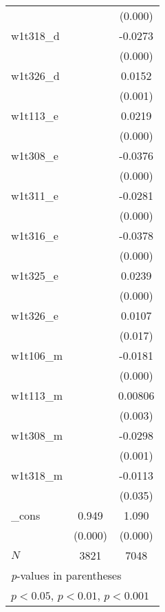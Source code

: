 {\begin{tabular}{l*{2}{c}}
            &                     &     (0.000)         \\
[1em]
w1t318\_d    &                     &     -0.0273\sym{***}\\
            &                     &     (0.000)         \\
[1em]
w1t326\_d    &                     &      0.0152\sym{***}\\
            &                     &     (0.001)         \\
[1em]
w1t113\_e    &                     &      0.0219\sym{***}\\
            &                     &     (0.000)         \\
[1em]
w1t308\_e    &                     &     -0.0376\sym{***}\\
            &                     &     (0.000)         \\
[1em]
w1t311\_e    &                     &     -0.0281\sym{***}\\
            &                     &     (0.000)         \\
[1em]
w1t316\_e    &                     &     -0.0378\sym{***}\\
            &                     &     (0.000)         \\
[1em]
w1t325\_e    &                     &      0.0239\sym{***}\\
            &                     &     (0.000)         \\
[1em]
w1t326\_e    &                     &      0.0107\sym{*}  \\
            &                     &     (0.017)         \\
[1em]
w1t106\_m    &                     &     -0.0181\sym{***}\\
            &                     &     (0.000)         \\
[1em]
w1t113\_m    &                     &     0.00806\sym{**} \\
            &                     &     (0.003)         \\
[1em]
w1t308\_m    &                     &     -0.0298\sym{**} \\
            &                     &     (0.001)         \\
[1em]
w1t318\_m    &                     &     -0.0113\sym{*}  \\
            &                     &     (0.035)         \\
[1em]
\_cons      &       0.949\sym{***}&       1.090\sym{***}\\
            &     (0.000)         &     (0.000)         \\
\hline
\(N\)       &        3821         &        7048         \\
\hline\hline
\multicolumn{3}{l}{\footnotesize \textit{p}-values in parentheses}\\
\multicolumn{3}{l}{\footnotesize \sym{*} \(p<0.05\), \sym{**} \(p<0.01\), \sym{***} \(p<0.001\)}\\
\end{tabular}
}
